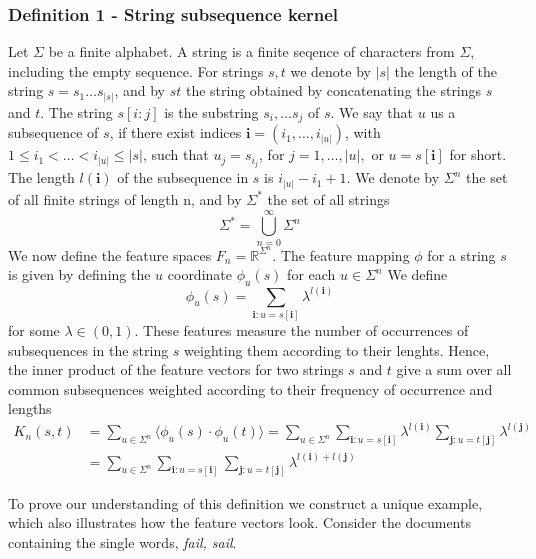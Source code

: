 \subsubsection*{Definition 1 - String subsequence kernel}
Let $ \Sigma $ be a finite alphabet. A string is a finite seqence of characters from $ \Sigma $, including the empty sequence. For strings $s,t$ we denote by $|s|$ the length of the string $ s = s_1 \dots s_{|s|} $, and by $ st $ the string obtained by concatenating the strings $ s $ and $ t $. The string $ s[i:j] $ is the substring $ s_i, \dots s_j $ of $ s $. We say that $ u $ us a subsequence of $ s $, if there exist indices $ \boldsymbol{i} = (i_1, \dots, i_{|u|}) $, with $ 1 \leq i_1 < \dots < i_{|u|} \leq |s| $, such that $ u_j = s_{i_{j}}$, for $ j = 1, \dots, |u|, $ or $ u = s[\boldsymbol{i}] $ for short. The length $ l(\boldsymbol{i}) $ of the subsequence in $ s $ is $ i_{|u|} - i_1 +1 $. We denote by $ \Sigma^n $ the set of all finite strings of length n, and by $ \Sigma^* $ the set of all strings 
\begin{equation}\label{eq:all_Strings}
\Sigma^* = \bigcup^{\infty}_{n=0}\Sigma^n
\end{equation}
We now define the feature spaces $ F_n = \mathbb{R}^{\Sigma^{n}} $. The feature mapping $ \phi $ for a string $ s $ is given by defining the $ u $ coordinate $ \phi_u(s) $ for each $u \in \Sigma^n  $ We define 
\begin{equation}
\phi_u(s) = \sum_{\boldsymbol{i}:u=s[\boldsymbol{i}]} \lambda^{l(\boldsymbol{i})}
\end{equation}
for some $ \lambda \in (0,1) $. These features measure the number of occurrences of subsequences in the string $ s $ weighting them according to their lenghts. Hence, the inner product of the feature vectors for two strings $ s $ and $ t $ give a sum over all common subsequences weighted according to their frequency of occurrence and lengths
\begin{align*}\label{key}
K_n(s,t) &= \sum_{u\in\Sigma^n} \langle \phi_u(s) \cdot \phi_u(t) \rangle = \sum_{u \in \Sigma^n} \sum_{\boldsymbol{i}:u=s[\boldsymbol{i}]} \lambda^{l(\boldsymbol{i})} \sum_{\boldsymbol{j}:u=t[\boldsymbol{j}]} \lambda^{l(\boldsymbol{j})} \\
& =  \sum_{u \in \Sigma^n} \sum_{\boldsymbol{i}:u=s[\boldsymbol{i}]}  \sum_{\boldsymbol{j}:u=t[\boldsymbol{j}]} \lambda^{l(\boldsymbol{i}) + l(\boldsymbol{j})}
\end{align*}


To prove our understanding of this definition we construct a unique example, which also illustrates how the feature vectors look. Consider the documents containing the single words, \textit{fail, sail}.

